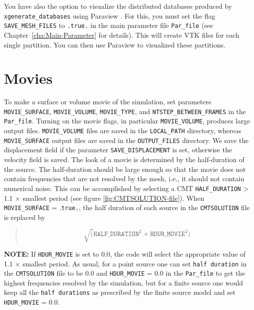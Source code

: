 You have also the option to visualize the distributed databases produced
by \texttt{xgenerate\_databases} using Paraview .
For this, you must set the flag \texttt{SAVE\_MESH\_FILES} to \texttt{.true.}
in the main parameter file \texttt{Par\_file} (see Chapter~\ref{cha:Main-Parameter}
for details). This will create VTK files for each single partition.
You can then use Paraview 
to visualized these partitions.


\section{Movies}\label{sec:Movies}

To make a surface or volume movie of the simulation, set parameters
\texttt{MOVIE\_SURFACE}, \texttt{MOVIE\_VOLUME}, \texttt{MOVIE\_TYPE},
and \texttt{NTSTEP\_BETWEEN\_FRAMES} in the \texttt{Par\_file}. Turning
on the movie flags, in particular \texttt{MOVIE\_VOLUME}, produces
large output files. \texttt{MOVIE\_VOLUME} files are saved in the
\texttt{LOCAL\_PATH} directory, whereas \texttt{MOVIE\_SURFACE} output
files are saved in the \texttt{OUTPUT\_FILES} directory. We save the
displacement field if the parameter \texttt{SAVE\_DISPLACEMENT} is
set, otherwise the velocity field is saved. The look of a movie is
determined by the half-duration of the source. The half-duration should
be large enough so that the movie does not contain frequencies that
are not resolved by the mesh, i.e., it should not contain numerical
noise. This can be accomplished by selecting a CMT \texttt{HALF\_DURATION}
> 1.1 $\times$ smallest period (see figure \ref{fig:CMTSOLUTION-file}).
When \texttt{MOVIE\_SURFACE} = .\texttt{true.}, the half duration
of each source in the \texttt{CMTSOLUTION} file is replaced by
\begin{quote}
\[
\sqrt{(}\mathrm{\mathtt{HALF\_DURATIO}\mathtt{N}^{2}}+\mathrm{\mathtt{HDUR\_MOVI}\mathtt{E}^{2}})
\]
\end{quote}
 
\textbf{NOTE:} If \texttt{HDUR\_MOVIE} is set to 0.0, the code will
select the appropriate value of 1.1 $\times$ smallest period. As
usual, for a point source one can set \texttt{half duration} in the
\texttt{CMTSOLUTION} file to be 0.0 and \texttt{HDUR\_MOVIE} = 0.0
in the \texttt{Par\_file} to get the highest frequencies resolved
by the simulation, but for a finite source one would keep all the
\texttt{half durations} as prescribed by the finite source model and
set \texttt{HDUR\_MOVIE} = 0.0.

